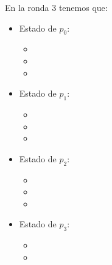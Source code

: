 En la ronda 3 tenemos que:
\begin{multicols}{2}
\begin{itemize}
\item Estado de $p_0$:
      \begin{itemize}
      \item {}
      
      \item {}
      
      \item {}
      \end{itemize}
      
\item Estado de $p_1$:
      \begin{itemize}
      \item {}
      
      \item {}
      
      \item {}
      \end{itemize}

\item Estado de $p_2$:
      \begin{itemize}
      \item {}
      
      \item {}
      
      \item {}
      \end{itemize}

\item Estado de $p_3$:
      \begin{itemize}
      \item {}
      
      \item {}
      

\end{itemize}
\end{itemize}
\end{multicols}
